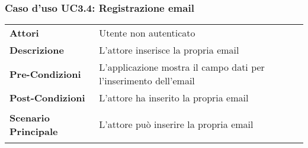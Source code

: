 \subsubsection{Caso d'uso UC3.4: Registrazione email}
\label{UC3_4}

\begin{longtable}{ l | p{11cm}}
	\hline
	\rowcolor{Gray}
	 \multicolumn{2}{c}{UC3.4 - Registrazione email} \\
	 \hline
	\textbf{Attori} & Utente non autenticato \\
	\textbf{Descrizione} & L'attore inserisce la propria email \\
	\textbf{Pre-Condizioni} & L'applicazione mostra il campo dati per l'inserimento dell'email \\
	\textbf{Post-Condizioni} & L'attore ha inserito la propria email \\
	\textbf{Scenario Principale} & \begin{enumerate*}[label=(\arabic*.),itemjoin={\newline}]
		\item L'attore può inserire la propria email
	\end{enumerate*}
\end{longtable}
